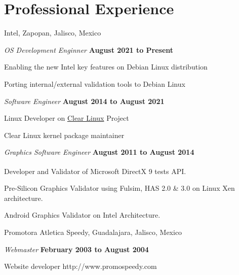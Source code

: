 \section{Professional Experience}
%
Intel, Zapopan, Jalisco, Mexico 
\begin{outerlist}
\item[] \textit{OS Development Enginner}%
    \hfill \textbf{August 2021 to Present}
    \begin{innerlist}
      \item Enabling the new Intel key features on Debian Linux distribution
      \item Porting internal/external validation tools to Debian Linux
    \end{innerlist}
\item[] \textit{Software Engineer}%
    \hfill \textbf{August 2014 to August 2021}
    \begin{innerlist}
      \item Linux Developer on 
	      \href{https://www.clearlinux.org/}{Clear Linux} Project
      \item Clear Linux kernel package maintainer
    \end{innerlist}
\item[] \textit{Graphics Software Engineer}%
    \hfill \textbf{August 2011 to August 2014}
    \begin{innerlist}
        \item Developer and Validator of
           Microsoft\textsuperscript{\textregistered}
           DirectX\textsuperscript{\textregistered} 9 tests API.
        \item Pre-Silicon Graphics Validator using Fulsim, HAS 2.0 \& 3.0 on Linux Xen architecture.
	\item Android Graphics Validator on Intel Architecture.
    \end{innerlist}
\end{outerlist}

\blankline

Promotora Atletica Speedy, Guadalajara, Jalisco, Mexico 
\begin{outerlist}
\item[] \textit{Webmaster}%
    \hfill \textbf{February 2003 to August 2004 }
    \begin{innerlist}
        \item Website developer http://www.promospeedy.com
    \end{innerlist}
\end{outerlist}

